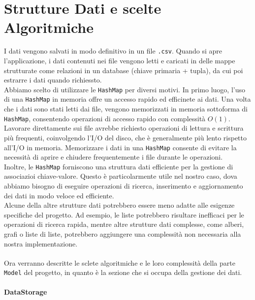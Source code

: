 \section{Strutture Dati e scelte Algoritmiche}
I dati vengono salvati in modo definitivo in un file \texttt{.csv}. Quando si apre l'applicazione, i dati contenuti nei file vengono letti e caricati in delle mappe strutturate
come relazioni in un database (chiave primaria + tupla), da cui poi estrarre i dati quando richiessto.\\
Abbiamo scelto di utilizzare le \texttt{HashMap} per diversi motivi. In primo luogo, l'uso di una \texttt{HashMap} in memoria offre un accesso rapido ed efficinete ai dati. 
Una volta che i dati sono stati letti dai file, vengono memorizzati in memoria sottoforma di \texttt{HashMap}, consentendo operazioni di accesso rapido con complessità $O(1)$.\\ 
Lavorare direttamente sui file avrebbe richiesto operazioni di lettura e scrittura più frequenti, coinvolgendo l'I/O del disco, che è generalmente più lento rispetto all'I/O in memoria.
Memorizzare i dati in una \texttt{HashMap} consente di evitare la necessità di aprire e chiudere frequentemente i file durante le operazioni.\\
Inoltre, le \texttt{HashMap} forniscono una struttura dati efficiente per la gestione di associazioi chiave-valore. Questo è particolarmente utile nel nostro caso, dova abbiamo bisogno
di eseguire operazioni di ricerca, inserimento e aggiornamento dei dati in modo veloce ed efficiente.\\
Alcune della altre strutture dati potrebbero essere meno adatte alle esigenze specifiche del progetto. Ad esempio, le liste potrebbero risultare inefficaci per le operazioni di ricerca 
rapida, mentre altre strutture dati complesse, come alberi, grafi o liste di liste, potrebbero aggiungere una complessità non necessaria alla nostra implementazione.\\
\\
Ora verranno descritte le sclete algoritmiche e le loro complessità della parte \texttt{Model} del progetto, in quanto è la sezione che si occupa della gestione dei dati.\\
\\
\textbf{DataStorage}

